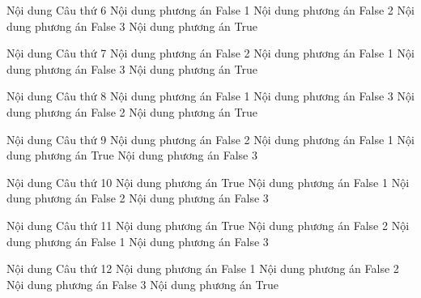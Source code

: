 \documentclass[FileMain.tex]{subfiles}
\begin{document}
\begin{ex}
	Nội dung Câu thứ 6
	\choice
	{Nội dung phương án False 1}
	{Nội dung phương án False 2}
	{Nội dung phương án False 3}
	{\True Nội dung phương án True}
	\loigiai{}
\end{ex}
\begin{ex}
	Nội dung Câu thứ 7
	\choice
	{Nội dung phương án False 2}
	{Nội dung phương án False 1}
	{Nội dung phương án False 3}
	{\True Nội dung phương án True}
	\loigiai{}
\end{ex}
\begin{ex}
	Nội dung Câu thứ 8
	\choice
	{Nội dung phương án False 1}
	{Nội dung phương án False 3}
	{Nội dung phương án False 2}
	{\True Nội dung phương án True}
	\loigiai{}
\end{ex}
\begin{ex}
	Nội dung Câu thứ 9
	\choice
	{Nội dung phương án False 2}
	{Nội dung phương án False 1}
	{\True Nội dung phương án True}
	{Nội dung phương án False 3}
	\loigiai{}
\end{ex}
\begin{ex}
	Nội dung Câu thứ 10
	\choice
	{\True Nội dung phương án True}
	{Nội dung phương án False 1}
	{Nội dung phương án False 2}
	{Nội dung phương án False 3}
	\loigiai{}
\end{ex}
\begin{ex}
	Nội dung Câu thứ 11
	\choice
	{\True Nội dung phương án True}
	{Nội dung phương án False 2}
	{Nội dung phương án False 1}
	{Nội dung phương án False 3}
	\loigiai{}
\end{ex}
\begin{ex}
	Nội dung Câu thứ 12
	\choice
	{Nội dung phương án False 1}
	{Nội dung phương án False 2}
	{Nội dung phương án False 3}
	{\True Nội dung phương án True}
	\loigiai{}
\end{ex}
\end{document}
